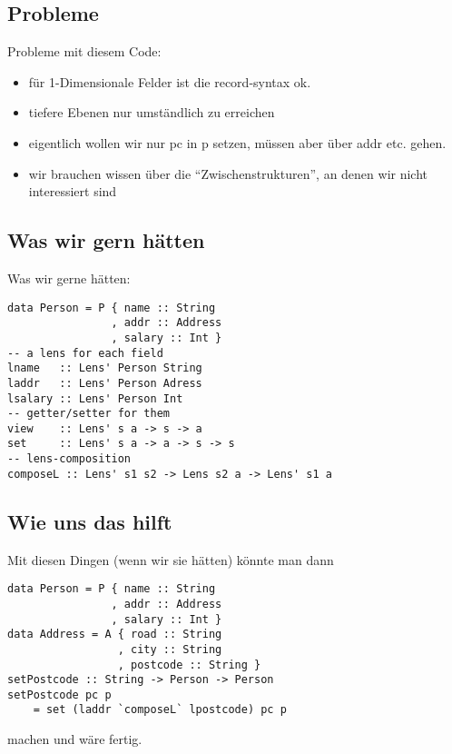 \documentclass{beamer}
\begin{document}
\subsection{Probleme}
\begin{frame}[fragile]
Probleme mit diesem Code:

\begin{itemize}
\item
  für 1-Dimensionale Felder ist die record-syntax ok.
\item
  tiefere Ebenen nur umständlich zu erreichen
\item
  eigentlich wollen wir nur pc in p setzen, müssen aber über addr etc.
  gehen.
\item
  wir brauchen wissen über die ``Zwischenstrukturen'', an denen wir
  nicht interessiert sind
\end{itemize}
\end{frame}

\subsection{Was wir gern hätten}
\begin{frame}[fragile]
Was wir gerne hätten:

\begin{verbatim}
data Person = P { name :: String
                , addr :: Address
                , salary :: Int }
-- a lens for each field
lname   :: Lens' Person String
laddr   :: Lens' Person Adress
lsalary :: Lens' Person Int
-- getter/setter for them
view    :: Lens' s a -> s -> a
set     :: Lens' s a -> a -> s -> s
-- lens-composition
composeL :: Lens' s1 s2 -> Lens s2 a -> Lens' s1 a
\end{verbatim}
\end{frame}

\subsection{Wie uns das hilft}
\begin{frame}[fragile]
Mit diesen Dingen (wenn wir sie hätten) könnte man dann

\begin{verbatim}
data Person = P { name :: String
                , addr :: Address
                , salary :: Int }
data Address = A { road :: String
                 , city :: String
                 , postcode :: String }
setPostcode :: String -> Person -> Person
setPostcode pc p
    = set (laddr `composeL` lpostcode) pc p
\end{verbatim}

machen und wäre fertig.
\end{frame}
\end{document}
